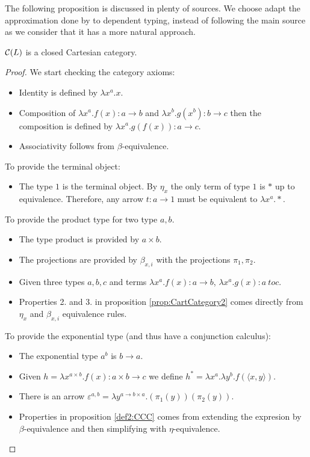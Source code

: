 The following proposition is discussed in plenty of sources. We choose adapt the approximation done by \cite{seely1984locally} to dependent typing, instead of following the main source \cite{lambek1985cartesian} as we consider that it has a more natural approach.
\begin{proposition}
  $\mathcal{C} (L)$ is a closed Cartesian  category. 
\end{proposition}
\begin{proof}
  We start checking the category axioms:
  \begin{itemize}
  \item Identity is defined by $\lambda x^a.x$.
  \item Composition of $\lambda x^a. f(x):  a\to b$ and $\lambda x^b. g(x^b): b \to c$ then the composition is defined by $\lambda x^a. g(f(x)): a \to c$.
  \item Associativity follows from $\beta$-equivalence.\\
  \end{itemize}
  To provide the terminal object:
  \begin{itemize}
  \item The type $1$ is the terminal object. By $\eta_x$ the only term of type $1$ is $*$ up to equivalence. Therefore, any arrow $t:a \to 1$ must be equivalent to $\lambda x^a. *$.\\
  \end{itemize}
  To provide the product type for two type $a,b$.
  \begin{itemize}
  \item The type product is provided by $a \times b$.
  \item The projections are provided by $\beta_{x,i}$ with the projections $\pi_1,\pi_2$.
  \item Given three types $a,b,c$ and terms $\lambda x^a. f(x) : a\to b$, $\lambda x^a. g(x) : a\ to c$.
  \item Properties 2. and 3. in proposition \ref{prop:CartCategory2} comes directly from $\eta_x$ and $\beta_{x,i}$ equivalence rules.\\
  \end{itemize}
  To provide the exponential type (and thus have a conjunction calculus):
  \begin{itemize}
  \item The exponential type $a^b$ is $b\to a$.
  \item Given $h = \lambda x^{a\times b}. f(x): a\times b \to c$  we define $h^* = \lambda x^a. \lambda y^b. f(\langle x,y\rangle)$.
  \item There is an arrow $\varepsilon^{a,b} = \lambda y^{a\to b \times a}. (\pi_1(y))(\pi_2(y))$.
  \item Properties in proposition \ref{def2:CCC} comes from extending the expresion by $\beta$-equivalence and then simplifying with $\eta$-equivalence.
  \end{itemize}
\end{proof}

